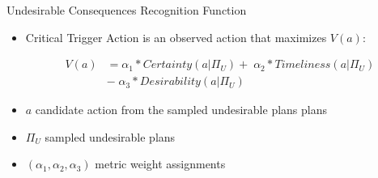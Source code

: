 \begin{frame}{Undesirable Consequences Recognition Function}
	\begin{itemize}
	\item Critical Trigger Action is an observed action that maximizes $V(a)$:
	
		\begin{align*}
		V(a) &= \alpha_1 * Certainty (a|\Pi_U) +\;\alpha_2 * Timeliness (a|\Pi_U) \\ &-\;\alpha_3 * Desirability (a|\Pi_U)
		\end{align*}
		
		\item $a  $ candidate action from the sampled undesirable plans plans
		\item $\Pi_U  $ sampled undesirable plans
		\item $(\alpha_1, \alpha_2, \alpha_3)  $ metric weight assignments
	\end{itemize}

\end{frame}